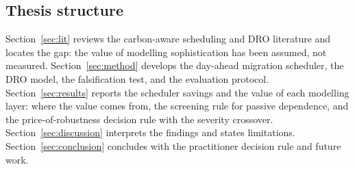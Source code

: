 \documentclass[10pt,twocolumn]{article}
\begin{document}
\subsection{Thesis structure}
Section~\ref{sec:lit} reviews the carbon-aware scheduling and DRO literature and
locates the gap: the value of modelling sophistication has been assumed, not
measured. Section~\ref{sec:method} develops the day-ahead migration scheduler, the
DRO model, the falsification test, and the evaluation protocol.
Section~\ref{sec:results} reports the scheduler savings and the value of each
modelling layer: where the value comes from, the screening rule for passive
dependence, and the price-of-robustness decision rule with the severity crossover.
Section~\ref{sec:discussion} interprets the findings and states limitations.
Section~\ref{sec:conclusion} concludes with the practitioner decision rule and future
work.
\end{document}
